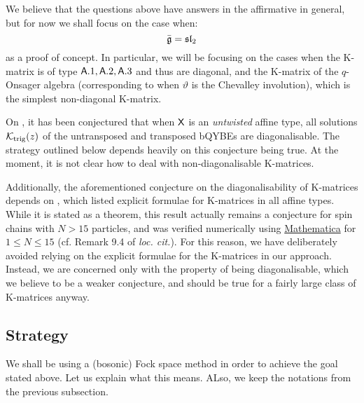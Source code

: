         We believe that the questions above have answers in the affirmative in general, but for now we shall focus on the case when:
            $$\bar{\mathfrak{g}} = \mathfrak{sl}_2$$
        as a proof of concept. In particular, we will be focusing on the cases when the K-matrix is of type $\mathsf{A}.1, \mathsf{A}.2, \mathsf{A}.3$ and thus are diagonal, and the K-matrix of the $q$-Onsager algebra (corresponding to when $\vartheta$ is the Chevalley involution), which is the simplest non-diagonal K-matrix.
        \begin{remark} \label{remark: untwisted_affine_K_matrices_are_diagonalisable}
            On \cite[p. 60]{regelskis_vlaar_reflection_matrices_coideal_subalgebras}, it has been conjectured that when $\mathsf{X}$ is an \textit{untwisted} affine type, all solutions $\mathcal{K}_{\mathrm{trig}}(z)$ of the untransposed and transposed bQYBEs are diagonalisable. The strategy outlined below depends heavily on this conjecture being true. At the moment, it is not clear how to deal with non-diagonalisable K-matrices.

            Additionally, the aforementioned conjecture on the diagonalisability of K-matrices depends on \cite[Theorem 9.3]{regelskis_vlaar_reflection_matrices_coideal_subalgebras}, which listed explicit formulae for K-matrices in all affine types. While it is stated as a theorem, this result actually remains a conjecture for spin chains with $N > 15$ particles, and was verified numerically using \url{Mathematica} for $1 \leq N \leq 15$ (cf. Remark 9.4 of \textit{loc. cit.}). For this reason, we have deliberately avoided relying on the explicit formulae for the K-matrices in our approach. Instead, we are concerned only with the property of being diagonalisable, which we believe to be a weaker conjecture, and should be true for a fairly large class of K-matrices anyway.
        \end{remark}

    \subsection{Strategy}
        We shall be using a (bosonic) Fock space method in order to achieve the goal stated above. Let us explain what this means. ALso, we keep the notations from the previous subsection.
    
